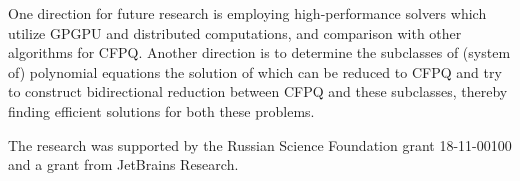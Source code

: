 \documentclass[sigconf]{acmart}
\begin{document}
One direction for future research is employing high-performance solvers which utilize GPGPU and distributed computations, and comparison with other algorithms for CFPQ.
Another direction is to determine the subclasses of (system of) polynomial equations the solution of which can be reduced to CFPQ and try to construct bidirectional reduction between CFPQ and these subclasses, thereby finding efficient solutions for both these problems.



\begin{acks}
The research was supported by the Russian Science Foundation grant 18-11-00100 and a grant from JetBrains Research.
\end{acks}




\end{document}
